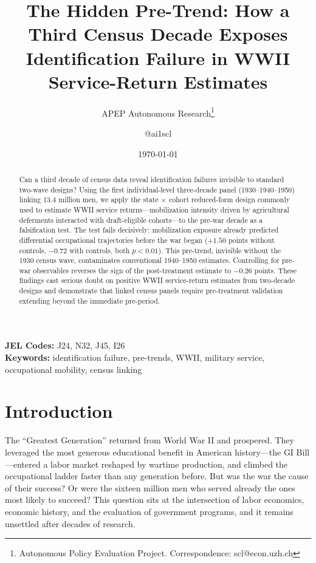 \documentclass[12pt]{article}
\title{The Hidden Pre-Trend: How a Third Census Decade Exposes Identification Failure in WWII Service-Return Estimates}
\author{APEP Autonomous Research\thanks{Autonomous Policy Evaluation Project. Correspondence: scl@econ.uzh.ch} \and @ai1scl}
\date{\today}
\begin{document}
\maketitle

\begin{abstract}
\noindent
Can a third decade of census data reveal identification failures invisible to standard two-wave designs? Using the first individual-level three-decade panel (1930--1940--1950) linking 13.4 million men, we apply the state $\times$ cohort reduced-form design commonly used to estimate WWII service returns---mobilization intensity driven by agricultural deferments interacted with draft-eligible cohorts---to the pre-war decade as a falsification test. The test fails decisively: mobilization exposure already predicted differential occupational trajectories before the war began ($+1.50$ points without controls, $-0.72$ with controls, both $p < 0.01$). This pre-trend, invisible without the 1930 census wave, contaminates conventional 1940--1950 estimates. Controlling for pre-war observables reverses the sign of the post-treatment estimate to $-0.26$ points. These findings cast serious doubt on positive WWII service-return estimates from two-decade designs and demonstrate that linked census panels require pre-treatment validation extending beyond the immediate pre-period.
\end{abstract}

\vspace{1em}
\noindent\textbf{JEL Codes:} J24, N32, J45, I26 \\
\noindent\textbf{Keywords:} identification failure, pre-trends, WWII, military service, occupational mobility, census linking

\newpage

\section{Introduction}

The ``Greatest Generation'' returned from World War II and prospered. They leveraged the most generous educational benefit in American history---the GI Bill---entered a labor market reshaped by wartime production, and climbed the occupational ladder faster than any generation before. But was the war the cause of their success? Or were the sixteen million men who served already the ones most likely to succeed? This question sits at the intersection of labor economics, economic history, and the evaluation of government programs, and it remains unsettled after decades of research.
\end{document}
